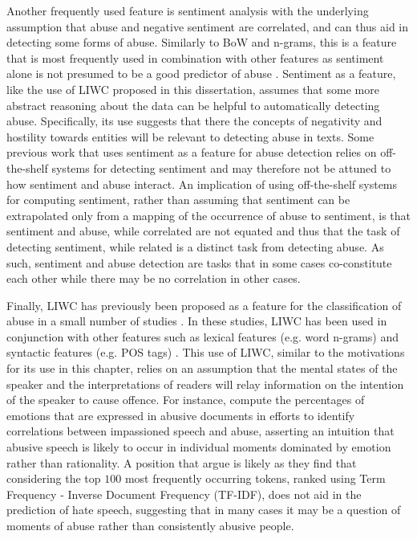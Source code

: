 Another frequently used feature is sentiment analysis \citep{Fortuna:2018} with the underlying assumption that abuse and negative sentiment are correlated, and can thus aid in detecting some forms of abuse.
Similarly to BoW and n-grams, this is a feature that is most frequently used in combination with other features as sentiment alone is not presumed to be a good predictor of abuse \citep{Fortuna:2018}.
Sentiment as a feature, like the use of LIWC proposed in this dissertation, assumes that some more abstract reasoning about the data can be helpful to automatically detecting abuse.
Specifically, its use suggests that there the concepts of negativity and hostility towards entities will be relevant to detecting abuse in texts.
Some previous work that uses sentiment as a feature for abuse detection \citep{Davidson:2017} relies on off-the-shelf systems for detecting sentiment and may therefore not be attuned to how sentiment and abuse interact.
An implication of using off-the-shelf systems for computing sentiment, rather than assuming that sentiment can be extrapolated only from a mapping of the occurrence of abuse to sentiment, is that sentiment and abuse, while correlated are not equated and thus that the task of detecting sentiment, while related is a distinct task from detecting abuse.
As such, sentiment and abuse detection are tasks that in some cases co-constitute each other while there may be no correlation in other cases.

Finally, LIWC has previously been proposed as a feature for the classification of abuse in a small number of studies \citep{Nina:2018,Joksimovic:2019}.
In these studies, LIWC has been used in conjunction with other features such as lexical features (e.g. word n-grams) and syntactic features (e.g. POS tags) \citep{Joksimovic:2019}.
This use of LIWC, similar to the motivations for its use in this chapter, relies on an assumption that the mental states of the speaker and the interpretations of readers will relay information on the intention of the speaker to cause offence.
For instance, \citet{Nina:2018} compute the percentages of emotions that are expressed in abusive documents in efforts to identify correlations between impassioned speech and abuse, asserting an intuition that abusive speech is likely to occur in individual moments dominated by emotion rather than rationality.
A position that \citep{Waseem:2016} argue is likely as they find that considering the top $100$ most frequently occurring tokens, ranked using Term Frequency - Inverse Document Frequency (TF-IDF), does not aid in the prediction of hate speech, suggesting that in many cases it may be a question of moments of abuse rather than consistently abusive people.

